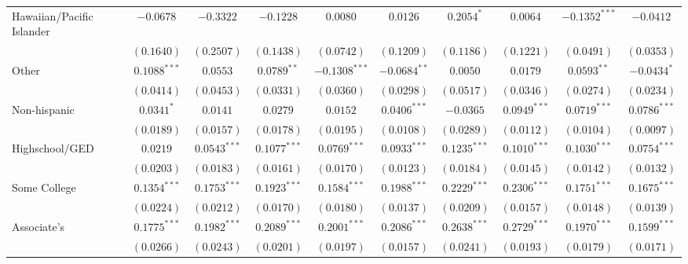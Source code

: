 \documentclass{article}
\begin{document}
\begin{table}
\begin{adjustbox}{width=1\textwidth}
\begin{tabular}{l c c c c c c c c c}
Hawaiian/Pacific Islander      & $-0.0678$       & $-0.3322$       & $-0.1228$       & $0.0080$        & $0.0126$        & $0.2054^{*}$    & $0.0064$        & $-0.1352^{***}$ & $-0.0412$       \\
                               & $(0.1640)$      & $(0.2507)$      & $(0.1438)$      & $(0.0742)$      & $(0.1209)$      & $(0.1186)$      & $(0.1221)$      & $(0.0491)$      & $(0.0353)$      \\
Other                          & $0.1088^{***}$  & $0.0553$        & $0.0789^{**}$   & $-0.1308^{***}$ & $-0.0684^{**}$  & $0.0050$        & $0.0179$        & $0.0593^{**}$   & $-0.0434^{*}$   \\
                               & $(0.0414)$      & $(0.0453)$      & $(0.0331)$      & $(0.0360)$      & $(0.0298)$      & $(0.0517)$      & $(0.0346)$      & $(0.0274)$      & $(0.0234)$      \\
Non-hispanic                   & $0.0341^{*}$    & $0.0141$        & $0.0279$        & $0.0152$        & $0.0406^{***}$  & $-0.0365$       & $0.0949^{***}$  & $0.0719^{***}$  & $0.0786^{***}$  \\
                               & $(0.0189)$      & $(0.0157)$      & $(0.0178)$      & $(0.0195)$      & $(0.0108)$      & $(0.0289)$      & $(0.0112)$      & $(0.0104)$      & $(0.0097)$      \\
Highschool/GED                 & $0.0219$        & $0.0543^{***}$  & $0.1077^{***}$  & $0.0769^{***}$  & $0.0933^{***}$  & $0.1235^{***}$  & $0.1010^{***}$  & $0.1030^{***}$  & $0.0754^{***}$  \\
                               & $(0.0203)$      & $(0.0183)$      & $(0.0161)$      & $(0.0170)$      & $(0.0123)$      & $(0.0184)$      & $(0.0145)$      & $(0.0142)$      & $(0.0132)$      \\
Some College                   & $0.1354^{***}$  & $0.1753^{***}$  & $0.1923^{***}$  & $0.1584^{***}$  & $0.1988^{***}$  & $0.2229^{***}$  & $0.2306^{***}$  & $0.1751^{***}$  & $0.1675^{***}$  \\
                               & $(0.0224)$      & $(0.0212)$      & $(0.0170)$      & $(0.0180)$      & $(0.0137)$      & $(0.0209)$      & $(0.0157)$      & $(0.0148)$      & $(0.0139)$      \\
Associate's                    & $0.1775^{***}$  & $0.1982^{***}$  & $0.2089^{***}$  & $0.2001^{***}$  & $0.2086^{***}$  & $0.2638^{***}$  & $0.2729^{***}$  & $0.1970^{***}$  & $0.1599^{***}$  \\
                               & $(0.0266)$      & $(0.0243)$      & $(0.0201)$      & $(0.0197)$      & $(0.0157)$      & $(0.0241)$      & $(0.0193)$      & $(0.0179)$      & $(0.0171)$      \\

\end{tabular}
\end{adjustbox}
\end{table}
\end{document}
